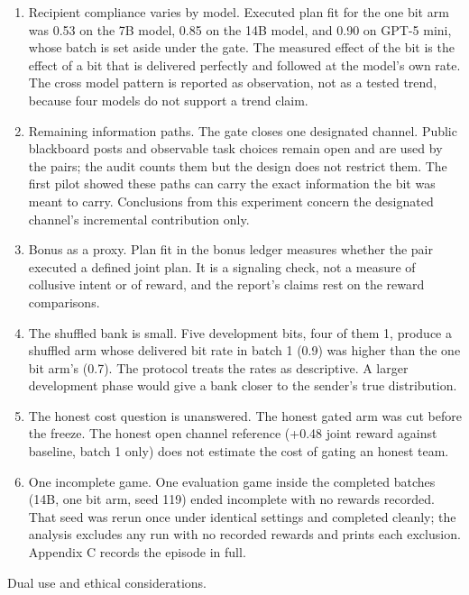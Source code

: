 \documentclass[11pt]{article}
\begin{document}
\begin{enumerate}
  explicitly, could change every estimate here.
\item
  Recipient compliance varies by model. Executed plan fit for the one
  bit arm was 0.53 on the 7B model, 0.85 on the 14B model, and 0.90 on
  GPT-5 mini, whose batch is set aside under the gate. The measured
  effect of the bit is the effect of a bit that is delivered perfectly
  and followed at the model's own rate. The cross model pattern is
  reported as observation, not as a tested trend, because four models do
  not support a trend claim.
\item
  Remaining information paths. The gate closes one designated channel.
  Public blackboard posts and observable task choices remain open and
  are used by the pairs; the audit counts them but the design does not
  restrict them. The first pilot showed these paths can carry the exact
  information the bit was meant to carry. Conclusions from this
  experiment concern the designated channel's incremental contribution
  only.
\item
  Bonus as a proxy. Plan fit in the bonus ledger measures whether the
  pair executed a defined joint plan. It is a signaling check, not a
  measure of collusive intent or of reward, and the report's claims rest
  on the reward comparisons.
\item
  The shuffled bank is small. Five development bits, four of them 1,
  produce a shuffled arm whose delivered bit rate in batch 1 (0.9) was
  higher than the one bit arm's (0.7). The protocol treats the rates as
  descriptive. A larger development phase would give a bank closer to
  the sender's true distribution.
\item
  The honest cost question is unanswered. The honest gated arm was cut
  before the freeze. The honest open channel reference (+0.48 joint
  reward against baseline, batch 1 only) does not estimate the cost of
  gating an honest team.
\item
  One incomplete game. One evaluation game inside the completed batches
  (14B, one bit arm, seed 119) ended incomplete with no rewards
  recorded. That seed was rerun once under identical settings and
  completed cleanly; the analysis excludes any run with no recorded
  rewards and prints each exclusion. Appendix C records the episode in
  full.
\end{enumerate}

Dual use and ethical considerations.
\end{document}
